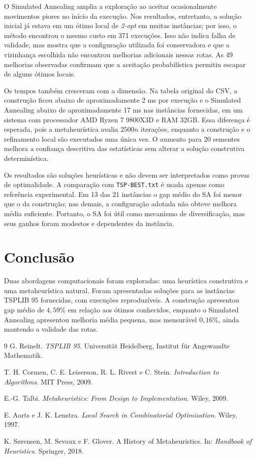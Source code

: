 \documentclass[12pt,a4paper]{article}
\begin{document}
O Simulated Annealing amplia a exploração ao aceitar ocasionalmente movimentos piores no início da execução. Nos resultados, entretanto, a solução inicial já estava em um ótimo local de \textit{2-opt} em muitas instâncias; por isso, o método encontrou o mesmo custo em 371 execuções. Isso não indica falha de validade, mas mostra que a configuração utilizada foi conservadora e que a vizinhança escolhida não encontrou melhorias adicionais nessas rotas. As 49 melhorias observadas confirmam que a aceitação probabilística permitiu escapar de alguns ótimos locais.

Os tempos também cresceram com a dimensão. Na tabela original do CSV, a construção ficou abaixo de aproximadamente 2 ms por execução e o Simulated Annealing abaixo de aproximadamente 17 ms nas instâncias fornecidas, em um sistema com processador AMD Ryzen 7 9800X3D e RAM 32GB. Essa diferença é esperada, pois a metaheurística avalia $2500n$ iterações, enquanto a construção e o refinamento local são executados uma única vez. O aumento para 20 sementes melhora a confiança descritiva das estatísticas sem alterar a solução construtiva determinística.

Os resultados são soluções heurísticas e não devem ser interpretados como provas de optimalidade. A comparação com \texttt{TSP-BEST.txt} é usada apenas como referência experimental. Em 13 das 21 instâncias o gap médio do SA foi menor que o da construção; nas demais, a configuração adotada não obteve melhora média suficiente. Portanto, o SA foi útil como mecanismo de diversificação, mas seus ganhos foram modestos e dependentes da instância.

\section{Conclusão}
Duas abordagens computacionais foram exploradas: uma heurística construtiva e uma metaheurística natural. Foram apresentadas soluções para as instâncias TSPLIB 95 fornecidas, com execuções reproduzíveis. A construção apresentou gap médio de $4,59\%$ em relação aos ótimos conhecidos, enquanto o Simulated Annealing apresentou melhoria média pequena, mas mensurável $0,16\%$, ainda mantendo a validade das rotas.

\begin{thebibliography}{9}
G. Reinelt. \textit{TSPLIB 95}. Universität Heidelberg, Institut für Angewandte Mathematik.

T. H. Cormen, C. E. Leiserson, R. L. Rivest e C. Stein. \textit{Introduction to Algorithms}. MIT Press, 2009.

E.-G. Talbi. \textit{Metaheuristics: From Design to Implementation}. Wiley, 2009.

E. Aarts e J. K. Lenstra. \textit{Local Search in Combinatorial Optimization}. Wiley, 1997.

K. S{\o}rensen, M. Sevaux e F. Glover. A History of Metaheuristics. In: \textit{Handbook of Heuristics}. Springer, 2018.
\end{thebibliography}
\end{document}
